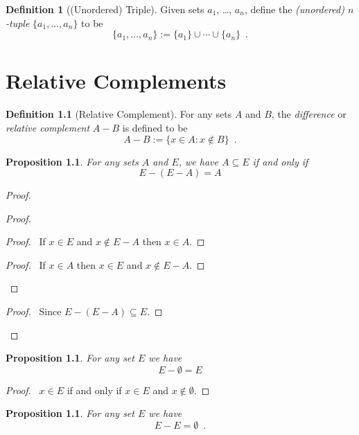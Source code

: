 \documentclass{report}
\let\qed\relax
\newtheorem{prop}[ax]{Proposition}
\theoremstyle{definition}
\newtheorem{df}[ax]{Definition}
\begin{document}
\begin{df}[(Unordered) Triple]
Given sets $a_1$, \ldots, $a_n$, define the \emph{(unordered) $n$-tuple} $\{a_1, \ldots, a_n\}$ to be
\[ \{a_1, \ldots, a_n\} := \{a_1\} \cup \cdots \cup \{a_n\} \enspace . \]
\end{df}

\chapter{Relative Complements}

\begin{df}[Relative Complement]
For any sets $A$ and $B$, the \emph{difference} or \emph{relative complement} $A - B$ is defined to be
\[ A - B := \{ x \in A : x \notin B \} \enspace . \]
\end{df}

\begin{prop}
For any sets $A$ and $E$, we have $A \subseteq E$ if and only if
\[ E - (E - A) = A \]
\end{prop}

\begin{proof}
\pf
{}
\begin{proof}
	\begin{proof}
		\pf\ If $x \in E$ and $x \notin E - A$ then $x \in A$.
	\end{proof}
	\begin{proof}
		\pf\ If $x \in A$ then $x \in E$ and $x \notin E - A$.
	\end{proof}
\end{proof}
\begin{proof}
	\pf\ Since $E - (E - A) \subseteq E$.
\end{proof}
\qed
\end{proof}

\begin{prop}
For any set $E$ we have
\[ E - \emptyset = E \]
\end{prop}

\begin{proof}
\pf\ $x \in E$ if and only if $x \in E$ and $x \notin \emptyset$. \qed
\end{proof}

\begin{prop}
For any set $E$ we have
\[ E - E = \emptyset \enspace . \]
\end{prop}
\end{document}
